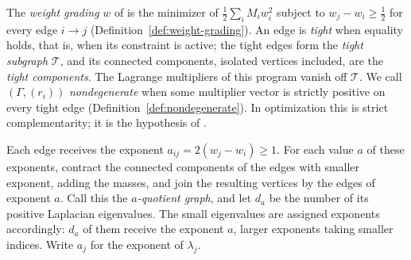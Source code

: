 \documentclass[11pt]{amsart}
\theoremstyle{definition}
\theoremstyle{remark}
\begin{document}
The \emph{weight grading} $w$ of \cite{HKKP2023} is the minimizer of
$\frac12\sum_iM_iw_i^2$ subject to $w_j-w_i\ge\frac12$ for every edge
$i\to j$ (Definition~\ref{def:weight-grading}). An edge is \emph{tight}
when equality holds, that is, when its constraint is active; the tight edges form the \emph{tight subgraph}
$\mathcal T$, and its connected components, isolated vertices included, are
the \emph{tight components}. The Lagrange multipliers of this program vanish
off $\mathcal T$. We call $(\Gamma,(r_i))$ \emph{nondegenerate} when some
multiplier vector is strictly positive on every tight edge
(Definition~\ref{def:nondegenerate}). In optimization this is strict
complementarity; it is the hypothesis of \cite[Theorem~3.6]{HKKP2023}.

Each edge receives the exponent $a_{ij}=2(w_j-w_i)\ge1$. For each value $a$
of these exponents, contract the connected components of the edges with
smaller exponent, adding the masses, and join the resulting vertices by the
edges of exponent $a$. Call this the \emph{$a$-quotient graph}, and let
$d_a$ be the number of its positive Laplacian eigenvalues. The small
eigenvalues are assigned exponents accordingly: $d_a$ of them receive the
exponent $a$, larger exponents taking smaller indices. Write $a_j$ for the
exponent of $\lambda_j$.
\end{document}

